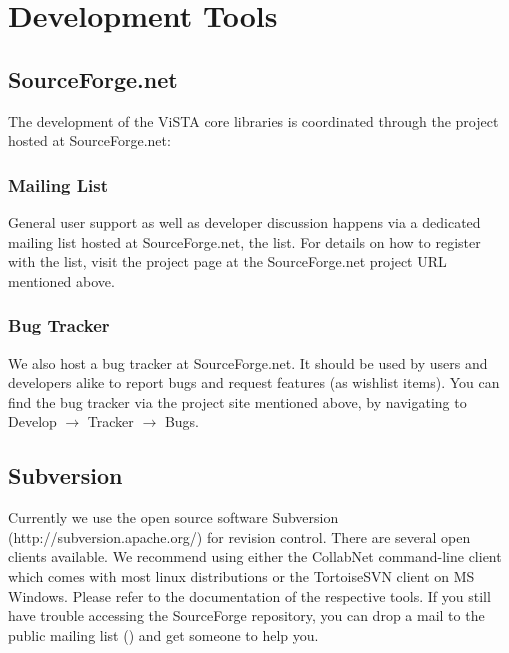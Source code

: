


\section{Development Tools}

\subsection{SourceForge.net}
The development of the ViSTA core libraries is coordinated through the  project hosted at SourceForge.net:


\subsubsection{Mailing List}
General user support as well as developer discussion happens via a dedicated mailing list hosted at SourceForge.net, the  list.
For details on how to register with the list, visit the  project page at the SourceForge.net project URL mentioned above.

\subsubsection{Bug Tracker}
We also host a bug tracker at SourceForge.net. 
It should be used by users and developers alike to report bugs and request features (as wishlist items).
You can find the bug tracker via the project site mentioned above, by navigating to Develop $\rightarrow$ Tracker $\rightarrow$ Bugs.

\subsection{Subversion}
Currently we use the open source software Subversion (http://subversion.apache.org/) for revision control.
There are several open clients available.
We recommend using either the CollabNet command-line client which comes with most linux distributions or the TortoiseSVN client on MS Windows.
Please refer to the documentation of the respective tools.
If you still have trouble accessing the SourceForge repository, you can drop a mail to the public mailing list () and get someone to help you.

